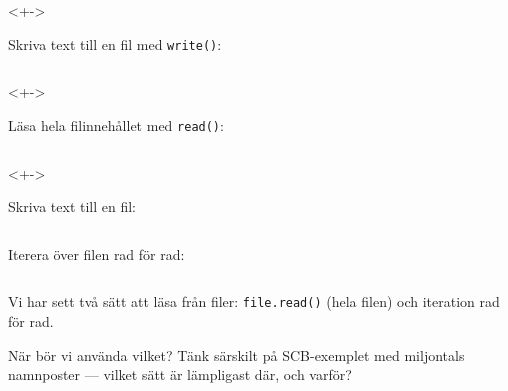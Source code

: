\begin{frame}[fragile]
  \begin{uncoverenv}<+->
    \begin{example}
      Skriva text till en fil med \texttt{write()}:
      \inputminted[firstline=31,lastline=36,firstnumber=31]{python}{examples/write_file.py}
    \end{example}
  \end{uncoverenv}

  \begin{uncoverenv}<+->
    \begin{example}
      Läsa hela filinnehållet med \texttt{read()}:
      \inputminted[firstline=23,lastline=29,firstnumber=23]{python}{examples/read_file.py}
    \end{example}
  \end{uncoverenv}
\end{frame}

\begin{frame}[fragile]
  \begin{uncoverenv}<+->
    \begin{example}
      Skriva text till en fil:
      \inputminted[firstline=31,lastline=36,firstnumber=31]{python}{examples/write_file.py}
    \end{example}
  \end{uncoverenv}

  \begin{example}
    Iterera över filen rad för rad:
    \inputminted[firstline=16,lastline=20,firstnumber=16,highlightlines={18-19}]{python}{examples/read_file.py}
  \end{example}
\end{frame}

\begin{frame}
  \begin{exercise}
    Vi har sett två sätt att läsa från filer: \texttt{file.read()}
    (hela filen) och iteration rad för rad.

    När bör vi använda vilket? Tänk särskilt på SCB-exemplet med miljontals
    namnposter --- vilket sätt är lämpligast där, och varför?
  \end{exercise}
\end{frame}

